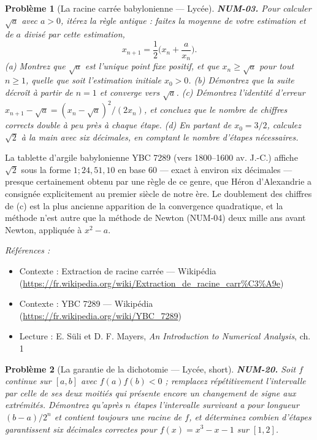 \documentclass[11pt]{article}
\newtheorem{problem}{Problème}
\newenvironment{refs}{\par\small\noindent\emph{Références :}\begin{itemize}\setlength\itemsep{0pt}}{\end{itemize}\normalsize}
\begin{document}
\bigskip

\begin{problem}[{La racine carrée babylonienne --- Lycée}]
\textbf{NUM-03.} Pour calculer $\sqrt{a}$ avec $a > 0$,
itérez la règle antique : faites la moyenne de votre estimation et de $a$ divisé par
cette estimation,
\[ x_{n+1} = \frac{1}{2}\Big( x_n + \frac{a}{x_n} \Big). \]
(a) Montrez que $\sqrt{a}$ est l'unique point fixe positif, et que
$x_n \ge \sqrt{a}$ pour tout $n \ge 1$, quelle que soit l'estimation initiale
$x_0 > 0$. (b) Démontrez que la suite décroît à partir de $n = 1$ et converge vers
$\sqrt{a}$. (c) Démontrez l'identité d'erreur
$x_{n+1} - \sqrt{a} = (x_n - \sqrt{a})^2/(2x_n)$, et concluez que le nombre de
chiffres corrects \textit{double} à peu près à chaque étape. (d) En partant de
$x_0 = 3/2$, calculez $\sqrt{2}$ à la main avec six décimales, en comptant le
nombre d'étapes nécessaires.
\end{problem}

\noindent La tablette d'argile babylonienne YBC 7289 (vers 1800--1600 av. J.-C.)
affiche $\sqrt{2}$ sous la forme $1;24,51,10$ en base 60 --- exact à environ six
décimales --- presque certainement obtenu par une règle de ce genre, que Héron
d'Alexandrie a consignée explicitement au premier siècle de notre ère. Le doublement
des chiffres de (c) est la plus ancienne apparition de la convergence quadratique, et
la méthode n'est autre que la méthode de Newton (NUM-04) deux mille ans avant Newton,
appliquée à $x^2 - a$.

\begin{refs}
\item Contexte : Extraction de racine carrée --- Wikipédia (\url{https://fr.wikipedia.org/wiki/Extraction_de_racine_carr%C3%A9e})
\item Contexte : YBC 7289 --- Wikipédia (\url{https://fr.wikipedia.org/wiki/YBC_7289})
\item Lecture : E. Süli et D. F. Mayers, \textit{An Introduction to Numerical Analysis}, ch. 1
\end{refs}

\bigskip

\begin{problem}[{La garantie de la dichotomie --- Lycée, short}]
\textbf{NUM-20.} Soit $f$ continue sur $[a,b]$ avec $f(a)f(b) < 0$ ; remplacez répétitivement l'intervalle par celle de ses deux moitiés qui présente encore un changement de signe aux extrémités. Démontrez qu'après $n$ étapes l'intervalle survivant a pour longueur $(b-a)/2^n$ et contient toujours une racine de $f$, et déterminez combien d'étapes garantissent six décimales correctes pour $f(x) = x^3 - x - 1$ sur $[1,2]$.
\end{problem}
\end{document}
